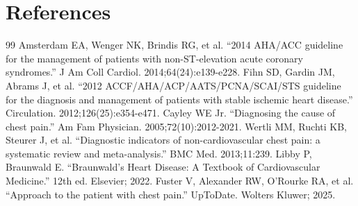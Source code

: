 \section*{References}
\begin{thebibliography}{99}
 Amsterdam EA, Wenger NK, Brindis RG, et al. ``2014 AHA/ACC guideline for the management of patients with non-ST-elevation acute coronary syndromes.'' J Am Coll Cardiol. 2014;64(24):e139-e228.
 Fihn SD, Gardin JM, Abrams J, et al. ``2012 ACCF/AHA/ACP/AATS/PCNA/SCAI/STS guideline for the diagnosis and management of patients with stable ischemic heart disease.'' Circulation. 2012;126(25):e354-e471.
 Cayley WE Jr. ``Diagnosing the cause of chest pain.'' Am Fam Physician. 2005;72(10):2012-2021.
 Wertli MM, Ruchti KB, Steurer J, et al. ``Diagnostic indicators of non-cardiovascular chest pain: a systematic review and meta-analysis.'' BMC Med. 2013;11:239.
 Libby P, Braunwald E. ``Braunwald's Heart Disease: A Textbook of Cardiovascular Medicine.'' 12th ed. Elsevier; 2022.
 Fuster V, Alexander RW, O'Rourke RA, et al. ``Approach to the patient with chest pain.'' UpToDate. Wolters Kluwer; 2025.
\end{thebibliography}
